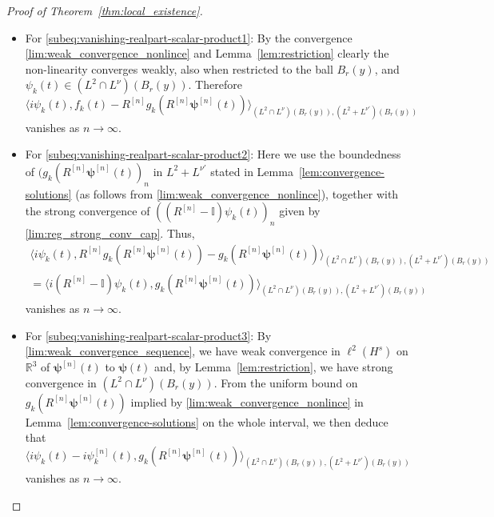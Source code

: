 \documentclass[12pt,a4paper]{amsart}
\numberwithin{equation}{section}
\newcommand{\ulpsi}{\boldsymbol{\psi}}
\begin{document}
\begin{proof}[Proof of Theorem~\ref{thm:local_existence}]
\begin{itemize}
			\item For \eqref{subeq:vanishing-realpart-scalar-product1}: By the convergence \eqref{lim:weak_convergence_nonlince} and Lemma~\ref{lem:restriction} clearly the non-linearity converges weakly, also when restricted to the ball $B_r(y) $, and $ \psi_k(t) \in (L^2\cap L^{\nu})(B_r(y)) $. Therefore
			\begin{equation}
				\langle i \psi_k(t) , f_{k}(t) -R^{[n]} g_{k}(R^{[n]}\ulpsi^{[n]}(t)) \rangle_{(L^2\cap L^{\nu})(B_r(y)), (L^2+L^{\nu'})(B_r(y))} 
			\end{equation}
			vanishes as $ n \rightarrow \infty $.
			\item For \eqref{subeq:vanishing-realpart-scalar-product2}: Here we use the boundedness of $  (g_{k}(R^{[n]}\ulpsi^{[n]}(t))_n$ in $L^2+L^{\nu'} $ stated in Lemma~\ref{lem:convergence-solutions} (as follows from \eqref{lim:weak_convergence_nonlince}), together with the strong convergence of $ ((R^{[n]} - \mathbb{I}) \psi_k(t))_n $ given by \eqref{lim:reg_strong_conv_cap}. Thus,
			\begin{multline}
				\langle i \psi_k(t) , R^{[n]} g_{k}(R^{[n]}\ulpsi^{[n]}(t)) - g_{k}(R^{[n]}\ulpsi^{[n]}(t))  \rangle_{(L^2\cap L^{\nu})(B_r(y)), (L^2+L^{\nu'})(B_r(y))}   \\
				= \langle i (R^{[n]}- \mathbb{I})\psi_k(t) ,  g_{k}(R^{[n]}\ulpsi^{[n]}(t))  \rangle_{(L^2\cap L^{\nu})(B_r(y)), (L^2+L^{\nu'})(B_r(y))}
			\end{multline}
			vanishes as $ n \rightarrow \infty $.
			\item For \eqref{subeq:vanishing-realpart-scalar-product3}: By \eqref{lim:weak_convergence_sequence}, we have weak convergence in $\ell^2(H^{s})$ on $\mathbb{R}^3$ of $ \ulpsi^{[n]}(t) $ to $ \ulpsi(t)$ and, by Lemma~\ref{lem:restriction}, we have strong convergence in $ (L^2\cap L^{\nu})(B_r(y)) $. From the uniform bound on~$ g_{k}(R^{[n]}\ulpsi^{[n]}(t)) $ implied by \eqref{lim:weak_convergence_nonlince} in Lemma~\ref{lem:convergence-solutions} on the whole interval, we then deduce that
			\begin{equation}
				\langle i \psi_k(t) - i \psi^{[n]}_{k}(t) ,  g_{k}(R^{[n]}\ulpsi^{[n]}(t)) \rangle_{(L^2\cap L^{\nu})(B_r(y)), (L^2+L^{\nu'})(B_r(y))}
			\end{equation}
			vanishes as $ n \rightarrow \infty $.
			

\end{itemize}
\end{proof}
\end{document}
